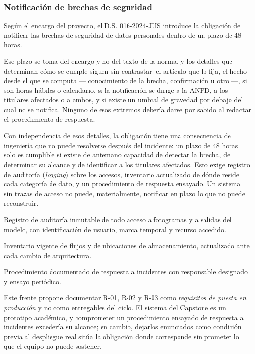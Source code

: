 \subsubsection{Notificación de brechas de seguridad}
\label{sec:brechas}

Según el encargo del proyecto, el D.S. 016-2024-JUS introduce la
obligación de notificar las brechas de seguridad de datos personales
dentro de un plazo de 48 horas.

Ese plazo se toma del encargo y no del texto de la norma, y los detalles
que determinan cómo se cumple siguen sin contrastar: el artículo que lo
fija, el hecho desde el que se computa --- conocimiento de la brecha,
confirmación u otro ---, si son horas hábiles o calendario, si la
notificación se dirige a la ANPD, a los titulares afectados o a ambos, y
si existe un umbral de gravedad por debajo del cual no se notifica.
Ninguno de esos extremos debería darse por sabido al redactar el
procedimiento de respuesta.

Con independencia de esos detalles, la obligación tiene una consecuencia
de ingeniería que no puede resolverse
después del incidente: un plazo de 48 horas solo es cumplible si existe
de antemano capacidad de detectar la brecha, de determinar su alcance y
de identificar a los titulares afectados. Esto exige registro de
auditoría (\emph{logging}) sobre los accesos, inventario actualizado de
dónde reside cada categoría de dato, y un procedimiento de respuesta
ensayado. Un sistema sin trazas de acceso no puede, materialmente,
notificar en plazo lo que no puede reconstruir.

\begin{description}[leftmargin=0pt,style=unboxed,itemsep=0.35em]
  \item[Requisito técnico derivado R-01.] Registro de auditoría inmutable
    de todo acceso a fotogramas y a salidas del modelo, con
    identificación de usuario, marca temporal y recurso accedido.
  \item[Requisito técnico derivado R-02.] Inventario vigente de flujos y
    de ubicaciones de almacenamiento, actualizado ante cada cambio de
    arquitectura.
  \item[Requisito técnico derivado R-03.] Procedimiento documentado de
    respuesta a incidentes con responsable designado y ensayo periódico.
\end{description}

Este frente propone documentar R-01, R-02 y R-03 como \emph{requisitos de
puesta en producción} y no como entregables del ciclo. El sistema del
Capstone es un prototipo académico, y comprometer un procedimiento
ensayado de respuesta a incidentes excedería su alcance; en cambio,
dejarlos enunciados como condición previa al despliegue real sitúa la
obligación donde corresponde sin prometer lo que el equipo no puede
sostener.

